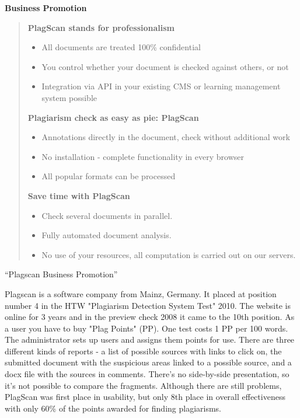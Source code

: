 \textbf{Business Promotion}
\begin{quote}
\textbf{PlagScan stands for professionalism}
\begin{itemize}
\item All documents are treated 100\% confidential
\item    You control whether your document is checked against others, or not
\item    Integration via API in your existing CMS or learning management system possible
\end{itemize}
\textbf{Plagiarism check as easy as pie: PlagScan}
\begin{itemize}
\item    Annotations directly in the document, check without additional work
\item    No installation - complete functionality in every browser
 \item   All popular formats can be processed
\end{itemize}
\textbf{Save time with PlagScan}
\begin{itemize}
\item    Check several documents in parallel.
\item    Fully automated document analysis.
 \item   No use of your resources, all computation is carried out on our servers.
\end{itemize}

\end{quote}
\enquote{Plagscan Business Promotion}\citep{PlagscanTest}

Plagscan is a software company from Mainz, Germany. It placed at position number 4 in the HTW "Plagiarism Detection System Test" 2010. The website is online for 3 years and in the preview check 2008 it came to the 10th position.
As a user you have to buy "Plag Points" (PP). One test costs 1 PP per 100 words. 
The administrator sets up users and assigns them points for use.
There are three different kinds of reports - a list of possible sources with links to click on, the submitted document with the suspicious areas linked to a possible source, and a docx file with the sources in comments.
There's no side-by-side presentation, so it's not possible to compare the fragments.
Although there are still problems, PlagScan was first place in usability, but only 8th place in overall effectiveness with only 60\% of the points awarded for finding plagiarisms.\citep{PlagscanTest}


